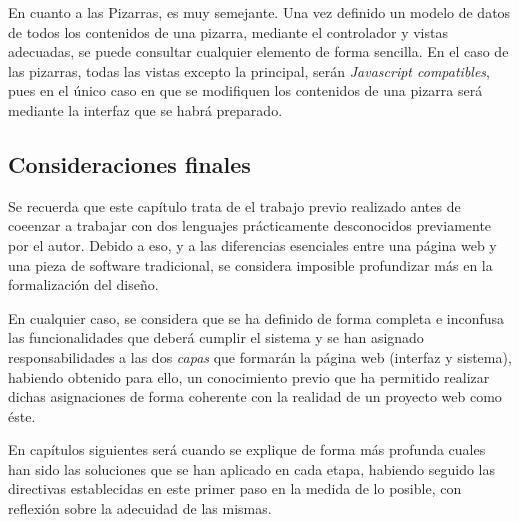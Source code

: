 En cuanto a las Pizarras, es muy semejante. Una vez definido un modelo de datos de todos los contenidos de una pizarra,  mediante el controlador y vistas adecuadas, se puede consultar cualquier elemento de forma sencilla. En el caso de las pizarras, todas las vistas excepto la principal, serán \emph{Javascript compatibles}, pues en el único caso en que se modifiquen los contenidos de una pizarra será mediante la interfaz que se habrá preparado.

\subsection{Consideraciones finales}
Se recuerda que este capítulo trata de el trabajo previo realizado antes de coeenzar a trabajar con dos lenguajes prácticamente desconocidos previamente por el autor. Debido a eso, y a las diferencias esenciales entre una página web y una pieza de software tradicional, se considera imposible profundizar más en la formalización del diseño.

En cualquier caso, se considera que se ha definido de forma completa e inconfusa las funcionalidades que deberá cumplir el sistema y se han asignado responsabilidades a las dos \emph{capas} que formarán la página web (interfaz y sistema), habiendo obtenido para ello, un conocimiento previo que ha permitido realizar dichas asignaciones de forma coherente con la realidad de un proyecto web como éste.

En capítulos siguientes será cuando se explique de forma más profunda cuales han sido las soluciones que se han aplicado en cada etapa, habiendo seguido las directivas establecidas en este primer paso en la medida de lo posible, con reflexión sobre la adecuidad de las mismas. 










